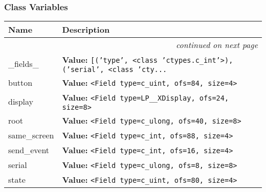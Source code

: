 
  \subsubsection{Class Variables}

    \vspace{-1cm}
\hspace{\varindent}\begin{longtable}{|p{\varnamewidth}|p{\vardescrwidth}|l}
\cline{1-2}
\cline{1-2} \centering \textbf{Name} & \centering \textbf{Description}& \\
\cline{1-2}
\endhead\cline{1-2}\multicolumn{3}{r}{\small\textit{continued on next page}}\\\endfoot\cline{1-2}
\endlastfoot\raggedright \_\-f\-i\-e\-l\-d\-s\-\_\- & \raggedright \textbf{Value:} 
{\tt \texttt{[}\texttt{(}\texttt{'}\texttt{type}\texttt{'}\texttt{, }{\textless}class 'ctypes.c\_int'{\textgreater}\texttt{)}\texttt{, }\texttt{(}\texttt{'}\texttt{serial}\texttt{'}\texttt{, }{\textless}class 'cty\texttt{...}}&\\
\cline{1-2}
\raggedright b\-u\-t\-t\-o\-n\- & \raggedright \textbf{Value:} 
{\tt {\textless}Field type=c\_uint, ofs=84, size=4{\textgreater}}&\\
\cline{1-2}
\raggedright d\-i\-s\-p\-l\-a\-y\- & \raggedright \textbf{Value:} 
{\tt {\textless}Field type=LP\_\_XDisplay, ofs=24, size=8{\textgreater}}&\\
\cline{1-2}
\raggedright r\-o\-o\-t\- & \raggedright \textbf{Value:} 
{\tt {\textless}Field type=c\_ulong, ofs=40, size=8{\textgreater}}&\\
\cline{1-2}
\raggedright s\-a\-m\-e\-\_\-s\-c\-r\-e\-e\-n\- & \raggedright \textbf{Value:} 
{\tt {\textless}Field type=c\_int, ofs=88, size=4{\textgreater}}&\\
\cline{1-2}
\raggedright s\-e\-n\-d\-\_\-e\-v\-e\-n\-t\- & \raggedright \textbf{Value:} 
{\tt {\textless}Field type=c\_int, ofs=16, size=4{\textgreater}}&\\
\cline{1-2}
\raggedright s\-e\-r\-i\-a\-l\- & \raggedright \textbf{Value:} 
{\tt {\textless}Field type=c\_ulong, ofs=8, size=8{\textgreater}}&\\
\cline{1-2}
\raggedright s\-t\-a\-t\-e\- & \raggedright \textbf{Value:} 
{\tt {\textless}Field type=c\_uint, ofs=80, size=4{\textgreater}}&\\

\end{longtable}
